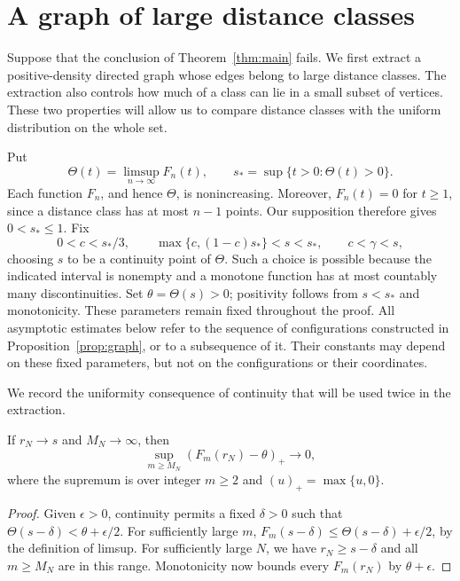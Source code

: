 \section{A graph of large distance classes}\label{sec:extremal}

Suppose that the conclusion of Theorem~\ref{thm:main} fails. We first
extract a positive-density directed graph whose edges belong to large
distance classes. The extraction also controls how much of a class can
lie in a small subset of vertices. These two properties will allow us to
compare distance classes with the uniform distribution on the whole set.

Put
\[
  \Theta(t)=\limsup_{n\to\infty}F_n(t),\qquad
  s_* = \sup\{t>0:\Theta(t)>0\}.
\]
Each function $F_n$, and hence $\Theta$, is nonincreasing. Moreover,
$F_n(t)=0$ for $t\ge1$, since a distance class has at most $n-1$ points.
Our supposition therefore gives $0<s_*\le1$. Fix
\begin{equation}\label{eq:ext-parameters}
  0<c<s_*/3,\qquad
  \max\{c,(1-c)s_*\}<s<s_*,\qquad c<\gamma<s,
\end{equation}
choosing $s$ to be a continuity point of $\Theta$. Such a choice is
possible because the indicated interval is nonempty and a monotone
function has at most countably many discontinuities. Set
$\theta=\Theta(s)>0$; positivity follows from $s<s_*$ and monotonicity.
These parameters remain fixed throughout the proof. All asymptotic
estimates below refer to the sequence of configurations constructed in
Proposition~\ref{prop:graph}, or to a subsequence of it. Their constants
may depend on these fixed parameters, but not on the configurations or
their coordinates.

We record the uniformity consequence of continuity that will be used
twice in the extraction.
\begin{lemma}\label{lem:ext-tail}
If $r_N\to s$ and $M_N\to\infty$, then
\[
  \sup_{m\ge M_N}(F_m(r_N)-\theta)_+\longrightarrow0,
\]
where the supremum is over integer $m\ge2$ and $(u)_+=\max\{u,0\}$.
\end{lemma}
\begin{proof}
Given $\epsilon>0$, continuity permits a fixed $\delta>0$ such that
$\Theta(s-\delta)<\theta+\epsilon/2$. For sufficiently large $m$,
$F_m(s-\delta)\le\Theta(s-\delta)+\epsilon/2$, by the definition of
limsup. For sufficiently large $N$, we have $r_N\ge s-\delta$ and all
$m\ge M_N$ are in this range. Monotonicity now bounds every
$F_m(r_N)$ by $\theta+\epsilon$.
\end{proof}

